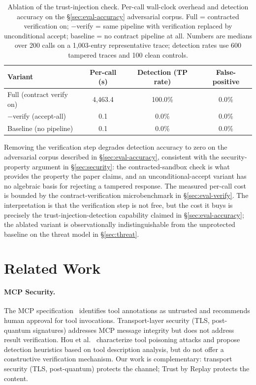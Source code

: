 \documentclass[letterpaper,twocolumn,10pt]{article}
\providecommand{\measuredFrom}[1]{}
\begin{document}
\begin{table}[t]
\centering
\caption{Ablation of the trust-injection check.  Per-call wall-clock
overhead and detection accuracy on the
\S\ref{sec:eval-accuracy} adversarial corpus.  Full = contracted
verification on; $-$verify = same pipeline with verification replaced
by unconditional accept; baseline = no contract pipeline at all.
Numbers are medians over 200 calls on a 1{,}003-entry representative
trace; detection rates use 600 tampered traces and 100 clean controls.}
\label{tab:ablation-mcp}
\small
\measuredFrom{HoloScript/packages/engine/src/simulation/__tests__/paper-cael-replay-benchmark.test.ts}%
\measuredFrom{HoloScript/.bench-logs/paper-1-mcp-ablation.json}%
\measuredFrom{research/benchmark-results-2026-05-21-paper-1-mcp-ablation.md}%
\begin{tabular}{lccc}
\toprule
\textbf{Variant} & \textbf{Per-call (\textmu{}s)} & \textbf{Detection (TP rate)} & \textbf{False-positive} \\
\midrule
Full (contract verify on)  & 4{,}463.4 & 100.0\%   & 0.0\% \\
$-$verify (accept-all)     & 0.1       & 0.0\%     & 0.0\% \\
Baseline (no pipeline)     & 0.1       & 0.0\%     & 0.0\% \\
\bottomrule
\end{tabular}
\end{table}

Removing the verification step degrades detection accuracy to zero on
the adversarial corpus described in \S\ref{sec:eval-accuracy},
consistent with the security-property argument in \S\ref{sec:security}:
the contracted-sandbox check is what provides the property the paper
claims, and an unconditional-accept variant has no algebraic basis for
rejecting a tampered response.  The measured per-call cost is bounded
by the contract-verification microbenchmark in \S\ref{sec:eval-verify}.
The interpretation is that the verification step is not free, but the
cost it buys is precisely the trust-injection-detection capability
claimed in \S\ref{sec:eval-accuracy}; the ablated variant is
observationally indistinguishable from the unprotected baseline on the
threat model in \S\ref{sec:threat}.

\section{Related Work}
\label{sec:related}

\paragraph{MCP Security.} The MCP specification~\cite{mcp-spec} identifies
tool annotations as untrusted and recommends human approval for tool
invocations. Transport-layer security (TLS, post-quantum signatures) addresses
MCP message integrity but does not address result verification. Hou et al.~\cite{hou2025mcp} characterize
tool poisoning attacks and propose detection heuristics based on tool
description analysis, but do not offer a constructive verification mechanism.
Our work is complementary: transport security (TLS, post-quantum) protects
the channel; Trust by Replay protects the content.
\end{document}
